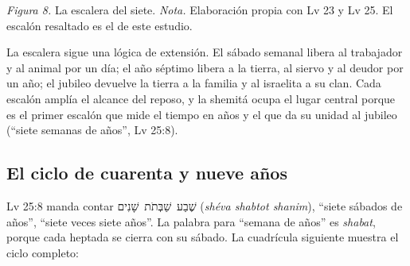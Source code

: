 \documentclass[11pt,letterpaper]{article}
\newcommand{\heb}[1]{\mbox{\foreignlanguage{hebrew}{#1}}}
\begin{document}
\begin{center}
\par
{\footnotesize\color{sepia}\textit{Figura 8.} La escalera del siete. \textit{Nota.} Elaboración propia con Lv 23 y Lv 25. El escalón resaltado es el de este estudio.}
\end{center}

La escalera sigue una lógica de extensión. El sábado semanal libera al trabajador y al animal por un día; el año séptimo libera a la tierra, al siervo y al deudor por un año; el jubileo devuelve la tierra a la familia y al israelita a su clan. Cada escalón amplía el alcance del reposo, y la shemitá ocupa el lugar central porque es el primer escalón que mide el tiempo en años y el que da su unidad al jubileo (``siete semanas de años'', Lv 25:8).

\subsection{El ciclo de cuarenta y nueve años}
Lv 25:8 manda contar \heb{שֶׁבַע שַׁבְּתֹת שָׁנִים} (\emph{shéva shabtot shanim}), ``siete sábados de años'', ``siete veces siete años''. La palabra para ``semana de años'' es \emph{shabat}, porque cada heptada se cierra con su sábado. La cuadrícula siguiente muestra el ciclo completo:
\end{document}
